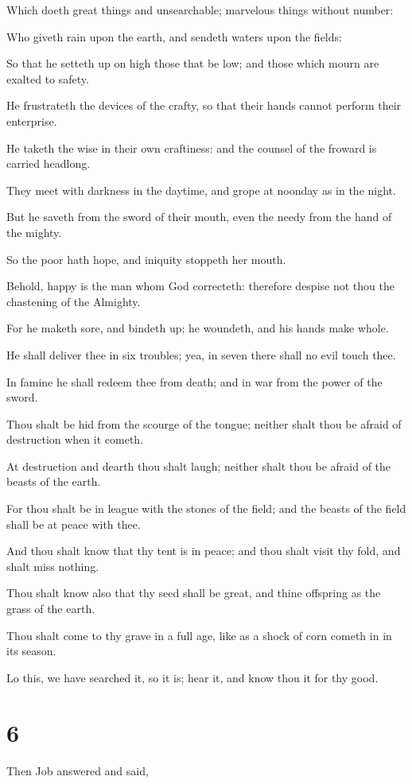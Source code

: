 \documentclass[12pt,oneside]{book}
\begin{document}
Which doeth great things and unsearchable; marvelous things without number:

Who giveth rain upon the earth, and sendeth waters upon the fields:

So that he setteth up on high those that be low; and those which mourn are exalted to safety.

He frustrateth the devices of the crafty, so that their hands cannot perform their enterprise.

He taketh the wise in their own craftiness: and the counsel of the froward is carried headlong.

They meet with darkness in the daytime, and grope at noonday as in the night.

But he saveth from the sword of their mouth, even the needy from the hand of the mighty.

So the poor hath hope, and iniquity stoppeth her mouth.

Behold, happy is the man whom God correcteth: therefore despise not thou the chastening of the Almighty.

For he maketh sore, and bindeth up; he woundeth, and his hands make whole.

He shall deliver thee in six troubles; yea, in seven there shall no evil touch thee.

In famine he shall redeem thee from death; and in war from the power of the sword.

Thou shalt be hid from the scourge of the tongue; neither shalt thou be afraid of destruction when it cometh.

At destruction and dearth thou shalt laugh; neither shalt thou be afraid of the beasts of the earth.

For thou shalt be in league with the stones of the field; and the beasts of the field shall be at peace with thee.

And thou shalt know that thy tent is in peace; and thou shalt visit thy fold, and shalt miss nothing.

Thou shalt know also that thy seed shall be great, and thine offspring as the grass of the earth.

Thou shalt come to thy grave in a full age, like as a shock of corn cometh in in its season.

Lo this, we have searched it, so it is; hear it, and know thou it for thy good.

\chapter{6}
Then Job answered and said,
\end{document}
